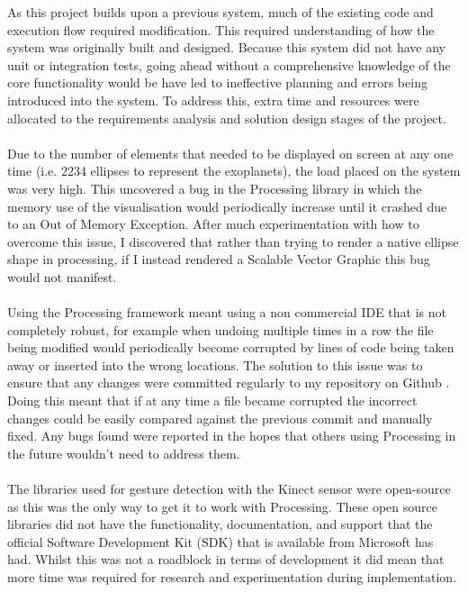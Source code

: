 As this project builds upon a previous system, much of the existing code and
execution flow required modification. This required understanding of how the
system was originally built and designed. Because this system did not have any
unit or integration tests, going ahead without a comprehensive knowledge of the
core functionality would be have led to ineffective planning and errors being
introduced into the system. To address this, extra time and resources were
allocated to the requirements analysis and solution design stages of the
project.
\\\\
Due to the number of elements that needed to be displayed on screen at any one
time (i.e. 2234 ellipses to represent the exoplanets), the load placed on the
system was very high. This uncovered a bug in
the Processing library in which the memory use of the visualisation would
periodically increase until it crashed due to an Out of Memory Exception. After
much experimentation with how to overcome this issue, I discovered that rather
than trying to render a native ellipse shape in processing, if I instead
rendered
a Scalable Vector Graphic this bug would not manifest. 
\\\\
Using the Processing framework meant using a non commercial IDE that is not
completely robust, for example when undoing multiple times in a row the file
being
modified would periodically become corrupted by lines of code being taken away
or inserted into the wrong locations. The solution to this issue was to ensure
that any changes were committed regularly to my repository on Github
\cite{github}. Doing this meant that if at any time a file became corrupted the
incorrect changes could be easily compared against the previous commit and
manually fixed. Any bugs found were reported in
the hopes that others using Processing in the future wouldn't need to address
them.
\\\\
The libraries used for gesture detection with the Kinect sensor were open-source
as this was the only way to get it to work with Processing. These open source
libraries did not have the functionality, documentation, and support that the
official Software Development Kit (SDK) that is available from Microsoft has
had. Whilst this was not a roadblock in terms of development it did mean that
more time was required for research and experimentation during implementation.
\\\\

